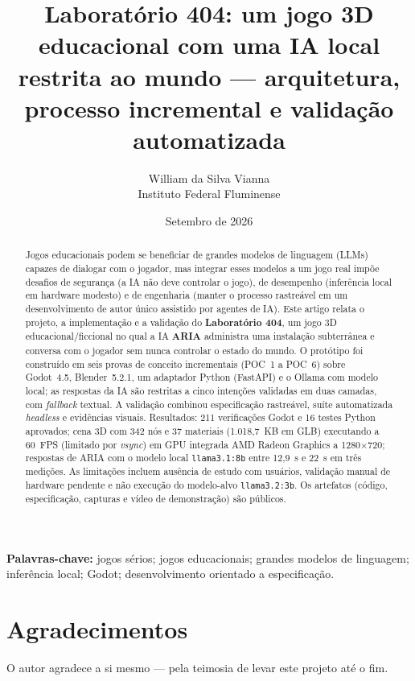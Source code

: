 \documentclass[11pt,a4paper]{article}
\title{Laborat\'orio 404: um jogo 3D educacional com uma IA local\\
restrita ao mundo --- arquitetura, processo incremental e valida\c{c}\~ao automatizada}
\author{William da Silva Vianna\\Instituto Federal Fluminense}
\date{Setembro de 2026}
\begin{document}
\maketitle

\begin{abstract}
\noindent
Jogos educacionais podem se beneficiar de grandes modelos de linguagem (LLMs)
capazes de dialogar com o jogador, mas integrar esses modelos a um jogo real
imp\~oe desafios de seguran\c{c}a (a IA n\~ao deve controlar o jogo), de
desempenho (infer\^encia local em hardware modesto) e de engenharia (manter o
processo rastre\'avel em um desenvolvimento de autor \'unico assistido por
agentes de IA). Este artigo relata o projeto, a implementa\c{c}\~ao e a
valida\c{c}\~ao do \textbf{Laborat\'orio 404}, um jogo 3D
educacional/ficcional no qual a IA \textbf{ARIA} administra uma instala\c{c}\~ao
subterr\^anea e conversa com o jogador sem nunca controlar o estado do mundo.
O prot\'otipo foi constru\'ido em seis provas de conceito incrementais
(POC~1 a POC~6) sobre Godot~4.5, Blender~5.2.1, um adaptador Python (FastAPI)
e o Ollama com modelo local; as respostas da IA s\~ao restritas a cinco
inten\c{c}\~oes validadas em duas camadas, com \textit{fallback} textual. A
valida\c{c}\~ao combinou especifica\c{c}\~ao rastre\'avel, su\'ite automatizada
\textit{headless} e evid\^encias visuais. Resultados: 211 verifica\c{c}\~oes
Godot e 16 testes Python aprovados; cena 3D com 342 n\'os e 37 materiais
(1.018,7~KB em GLB) executando a 60~FPS (limitado por \textit{vsync}) em GPU
integrada AMD Radeon Graphics a 1280$\times$720; respostas de ARIA com o modelo
local \texttt{llama3.1:8b} entre 12,9~s e 22~s em tr\^es medi\c{c}\~oes. As
limita\c{c}\~oes incluem aus\^encia de estudo com usu\'arios, valida\c{c}\~ao
manual de hardware pendente e n\~ao execu\c{c}\~ao do modelo-alvo
\texttt{llama3.2:3b}. Os artefatos (c\'odigo, especifica\c{c}\~ao, capturas e
v\'ideo de demonstra\c{c}\~ao) s\~ao p\'ublicos.
\end{abstract}

\noindent\textbf{Palavras-chave:} jogos s\'erios; jogos educacionais; grandes
modelos de linguagem; infer\^encia local; Godot; desenvolvimento orientado a
especifica\c{c}\~ao.








\section*{Agradecimentos}
O autor agradece a si mesmo --- pela teimosia de levar este projeto at\'e o fim.



\end{document}
